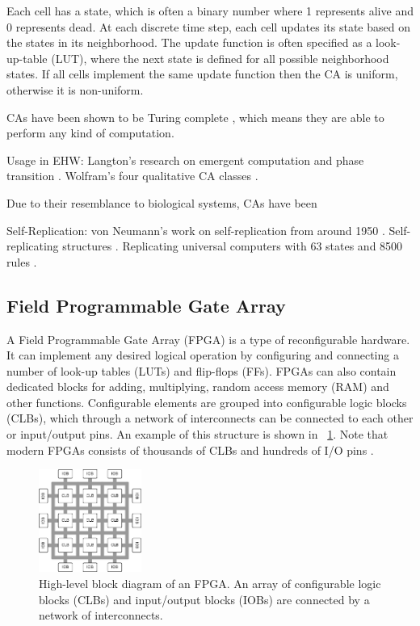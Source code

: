 Each cell has a state, which is often a binary number where 1 represents alive and 0 represents dead.
At each discrete time step, each cell updates its state based on the states in its neighborhood.
The update function is often specified as a look-up-table (LUT), where the next state is defined for all possible neighborhood states\footnotemark.
If all cells implement the same update function then the CA is uniform, otherwise it is non-uniform.

CAs have been shown to be Turing complete \cite{neumann1966selfreplication} \cite{codd1968cellular}, which means they are able to perform any kind of computation.


Usage in EHW:
Langton's research on emergent computation and phase transition \cite{langton1990edgeofchaos}.
Wolfram's four qualitative CA classes \cite{wolfram1984complexity}.

Due to their resemblance to biological systems, CAs have been 

Self-Replication:
von Neumann's work on self-replication from around 1950 \cite{neumann1966selfreplication}.
Self-replicating structures \cite{reggia1998neumann}.
Replicating universal computers with 63 states and 8500 rules \cite{perrier1996toward}.

\subsection{Field Programmable Gate Array}

A Field Programmable Gate Array (FPGA) is a type of reconfigurable hardware.
It can implement any desired logical operation by configuring and connecting a number of look-up tables (LUTs) and flip-flops (FFs).
FPGAs can also contain dedicated blocks for adding, multiplying, random access memory (RAM) and other functions.
Configurable elements are grouped into configurable logic blocks (CLBs), which through a network of interconnects can be connected to each other or input/output pins.
An example of this structure is shown in \figurename~\ref{fig:fpga}.
Note that modern FPGAs consists of thousands of CLBs and hundreds of I/O pins \cite{ds160}.

\begin{figure}[!ht]
    \centering
    \includegraphics[width=0.30\textwidth]{figures/fpga}
    \caption{High-level block diagram of an FPGA. An array of configurable logic blocks (CLBs) and input/output blocks (IOBs) are connected by a network of interconnects.}
    \label{fig:fpga}
\end{figure}

